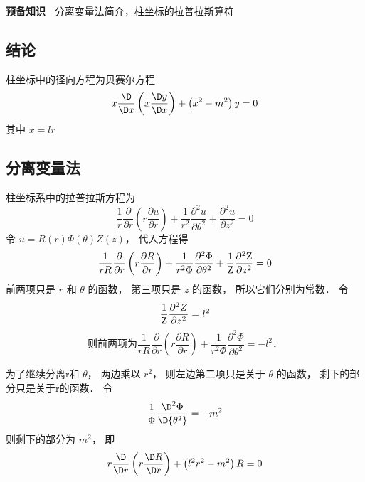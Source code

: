 
\begin{mdframed} \textbf{预备知识\ } 分离变量法简介，柱坐标的拉普拉斯算符
 \end{mdframed} 

\subsection{结论}

柱坐标中的径向方程为贝赛尔方程
 \begin{equation}
x\frac{\D}{{\D x}}\left( {x\frac{{\D y}}{{\D x}}} \right) + \left( {{x^2} - {m^2}} \right)y = 0
\end{equation}
其中 $x = lr$ 

\subsection{分离变量法}
柱坐标系中的拉普拉斯方程为
\begin{equation}
\frac{1}{r}\frac{\partial }{{\partial r}}\left( {r\frac{{\partial u}}{{\partial r}}} \right) + \frac{1}{{{r^2}}}\frac{{{\partial ^2}u}}{{\partial {\theta ^2}}} + \frac{{{\partial ^2}u}}{{\partial {z^2}}} = 0
\end{equation}
令 $u = R\left( r \right)\Phi \left( \theta  \right)Z\left( z \right)$，   代入方程得
\begin{equation}
\frac{1}{{rR}}\frac{\partial }{{\partial r}}\left( {r\frac{{\partial R}}{{\partial r}}} \right) + \frac{1}{{{r^2}\Phi }}\frac{{{\partial ^2}\Phi }}{{\partial {\theta ^2}}} + \frac{1}{{\rm Z}}\frac{{{\partial ^2}{\rm Z}}}{{\partial {z^2}}} = 0
\end{equation}
前两项只是 $r$ 和 $\theta $ 的函数， 第三项只是 $z$ 的函数， 所以它们分别为常数． 令
\begin{equation}\label{CylLap_4}
\frac{1}{{\rm Z}}\frac{{{\partial ^2}Z}}{{\partial {z^2}}} = {l^2}
\end{equation}
\begin{equation}
\text{ 则前两项为} \frac{1}{{rR}}\frac{\partial }{{\partial r}}\left( {r\frac{{\partial R}}{{\partial r}}} \right) + \frac{1}{{{r^2}\Phi }}\frac{{{\partial ^2}\Phi }}{{\partial {\theta ^2}}} =  - {l^2} \text{． } 
\end{equation}

为了继续分离r和 $\theta $，   两边乘以 ${r^2}$，   则左边第二项只是关于 $\theta $  的函数， 剩下的部分只是关于r的函数． 令
\begin{equation}\label{CylLap_6}
\frac{1}{\Phi }\frac{{{\D ^2}\Phi }}{{\D {\theta ^2}}} =  - {m^2}
\end{equation}
则剩下的部分为 ${m^2}$，   即
  \begin{equation}\label{CylLap_7}
r\frac{\D }{{\D r}}\left( {r\frac{{\D R}}{{\D r}}} \right) + \left( {{l^2}{r^2} - {m^2}} \right)R = 0
\end{equation}

